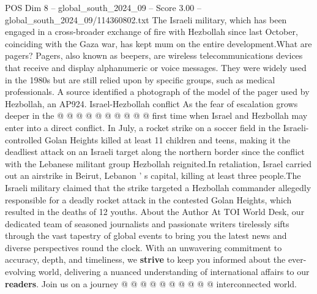 \begin{textsample}{POS Dim 8 – global\_south\_2024\_09 – Score 3.00 – global\_south\_2024\_09/114360802.txt}
The Israeli military, which has been engaged in a cross-broader exchange of fire with Hezbollah since last October, coinciding with the Gaza war, has kept mum on the entire development.What are pagers?
Pagers, also known as beepers, are wireless telecommunications devices that receive and display alphanumeric or voice messages.
They were widely used in the 1980s but are still relied upon by specific groups, such as medical professionals.
A source identified a photograph of the model of the pager used by Hezbollah, an AP924.
Israel-Hezbollah conflict As the fear of escalation grows deeper in the @ @ @ @ @ @ @ @ @ @ first time when Israel and Hezbollah may enter into a direct conflict.
In July, a rocket strike on a soccer field in the Israeli-controlled Golan Heights killed at least 11 children and teens, making it the deadliest attack on an Israeli target along the northern border since the conflict with the Lebanese militant group Hezbollah reignited.In retaliation, Israel carried out an airstrike in Beirut, Lebanon ' s capital, killing at least three people.The Israeli military claimed that the strike targeted a Hezbollah commander allegedly responsible for a deadly rocket attack in the contested Golan Heights, which resulted in the deaths of 12 youths.
About the Author At TOI World Desk, our dedicated team of seasoned journalists and passionate writers tirelessly sifts through the vast tapestry of global events to bring you the latest news and diverse perspectives round the clock.
With an unwavering commitment to accuracy, depth, and timeliness, we \textbf{strive} to keep you informed about the ever-evolving world, delivering a nuanced understanding of international affairs to our \textbf{readers}.
Join us on a journey @ @ @ @ @ @ @ @ @ @ interconnected world.

\end{textsample}
